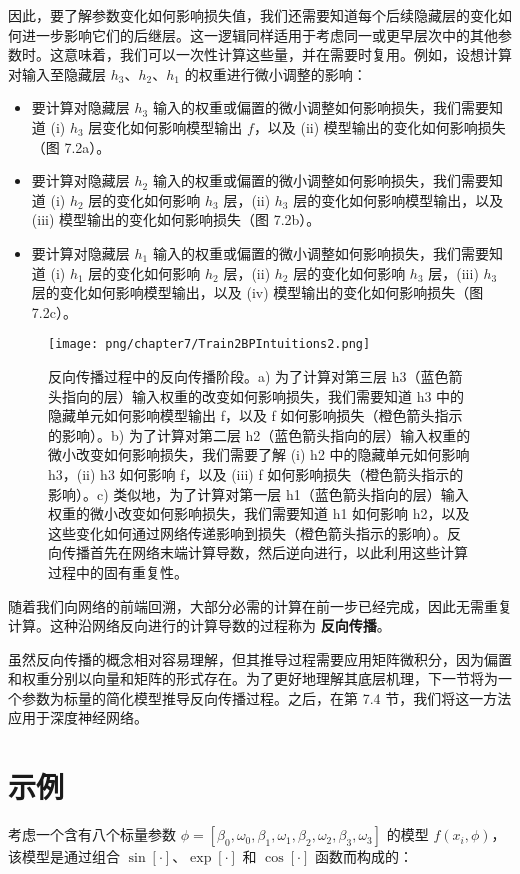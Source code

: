 因此，要了解参数变化如何影响损失值，我们还需要知道每个后续隐藏层的变化如何进一步影响它们的后继层。这一逻辑同样适用于考虑同一或更早层次中的其他参数时。这意味着，我们可以一次性计算这些量，并在需要时复用。例如，设想计算对输入至隐藏层 \(h_3\)、\(h_2\)、\(h_1\) 的权重进行微小调整的影响：

\begin{itemize}
    \item 要计算对隐藏层 \(h_3\) 输入的权重或偏置的微小调整如何影响损失，我们需要知道 (i) \(h_3\) 层变化如何影响模型输出 \(f\)，以及 (ii) 模型输出的变化如何影响损失（图 7.2a）。
    \item 要计算对隐藏层 \(h_2\) 输入的权重或偏置的微小调整如何影响损失，我们需要知道 (i) \(h_2\) 层的变化如何影响 \(h_3\) 层，(ii) \(h_3\) 层的变化如何影响模型输出，以及 (iii) 模型输出的变化如何影响损失（图 7.2b）。
    \item 要计算对隐藏层 \(h_1\) 输入的权重或偏置的微小调整如何影响损失，我们需要知道 (i) \(h_1\) 层的变化如何影响 \(h_2\) 层，(ii) \(h_2\) 层的变化如何影响 \(h_3\) 层，(iii) \(h_3\) 层的变化如何影响模型输出，以及 (iv) 模型输出的变化如何影响损失（图 7.2c）。
\end{itemize}


\begin{figure}[ht!]
\centering
\texttt{[image: png/chapter7/Train2BPIntuitions2.png]}
\caption{反向传播过程中的反向传播阶段。a) 为了计算对第三层 h3（蓝色箭头指向的层）输入权重的改变如何影响损失，我们需要知道 h3 中的隐藏单元如何影响模型输出 f，以及 f 如何影响损失（橙色箭头指示的影响）。b) 为了计算对第二层 h2（蓝色箭头指向的层）输入权重的微小改变如何影响损失，我们需要了解 (i) h2 中的隐藏单元如何影响 h3，(ii) h3 如何影响 f，以及 (iii) f 如何影响损失（橙色箭头指示的影响）。c) 类似地，为了计算对第一层 h1（蓝色箭头指向的层）输入权重的微小改变如何影响损失，我们需要知道 h1 如何影响 h2，以及这些变化如何通过网络传递影响到损失（橙色箭头指示的影响）。反向传播首先在网络末端计算导数，然后逆向进行，以此利用这些计算过程中的固有重复性。}
\end{figure}

随着我们向网络的前端回溯，大部分必需的计算在前一步已经完成，因此无需重复计算。这种沿网络反向进行的计算导数的过程称为 \textbf{反向传播}。


虽然反向传播的概念相对容易理解，但其推导过程需要应用矩阵微积分，因为偏置和权重分别以向量和矩阵的形式存在。为了更好地理解其底层机理，下一节将为一个参数为标量的简化模型推导反向传播过程。之后，在第 7.4 节，我们将这一方法应用于深度神经网络。
\section{示例}
考虑一个含有八个标量参数 \(\phi = [\beta_0, \omega_0, \beta_1, \omega_1, \beta_2, \omega_2, \beta_3, \omega_3]\) 的模型 \(f(x_i, \phi)\)，该模型是通过组合 \(\sin[\cdot]\)、\(\exp[\cdot]\) 和 \(\cos[\cdot]\) 函数而构成的：

